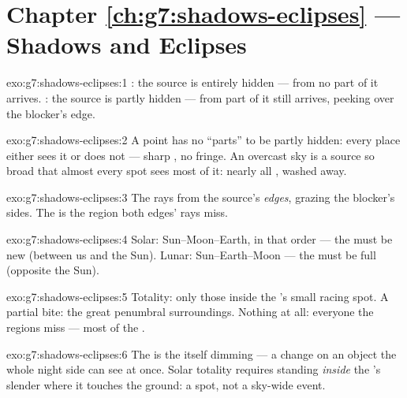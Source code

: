 \section*{Chapter \ref{ch:g7:shadows-eclipses} --- Shadows and Eclipses}

\begin{solution}{exo:g7:shadows-eclipses:1}
: the source is entirely hidden ---  from no part of it
arrives. : the source is partly hidden ---  from
part of it still arrives, peeking over the blocker's edge.
\end{solution}

\begin{solution}{exo:g7:shadows-eclipses:2}
A point has no ``parts'' to be partly hidden: every place either
sees it or does not --- sharp , no fringe. An overcast sky
is a source so broad that almost every spot sees most of it:
nearly all ,  washed away.
\end{solution}

\begin{solution}{exo:g7:shadows-eclipses:3}
The rays from the source's \emph{edges}, grazing the blocker's
sides. The  is the region both edges' rays miss.
\end{solution}

\begin{solution}{exo:g7:shadows-eclipses:4}
Solar: Sun--Moon--Earth, in that order --- the  must be new
(between us and the Sun). Lunar: Sun--Earth--Moon --- the 
must be full (opposite the Sun).
\end{solution}

\begin{solution}{exo:g7:shadows-eclipses:5}
Totality: only those inside the 's small racing spot. A
partial bite: the great penumbral surroundings. Nothing at all:
everyone the  regions miss --- most of the .
\end{solution}

\begin{solution}{exo:g7:shadows-eclipses:6}
The  is the  itself dimming --- a change on an
object the whole night side can see at once. Solar totality
requires standing \emph{inside} the 's slender  where
it touches the ground: a spot, not a sky-wide event.
\end{solution}

